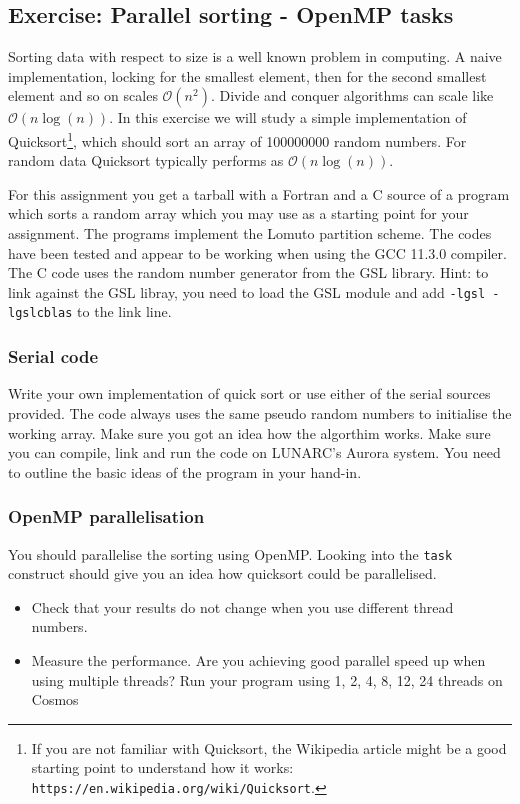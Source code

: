 \subsection{Exercise: Parallel sorting - OpenMP tasks}

Sorting data with respect to size is a well known problem in computing.  A naive implementation, locking for the smallest element, then for the second smallest element and so on scales ${\mathcal O}(n^2)$.  Divide and conquer algorithms can scale like ${\mathcal O}(n \log(n))$.   In this exercise we will study a simple implementation of Quicksort\footnote{If you are not familiar with Quicksort, the Wikipedia article might be a good starting point to understand how it works:  \texttt{https://en.wikipedia.org/wiki/Quicksort}.

 }, which should sort an array of 100000000 random numbers.  For random data Quicksort typically performs as ${\mathcal O}(n \log(n))$.

For this assignment you get a tarball with a Fortran and a C source of a program which sorts a random array which you may use as a starting point for your assignment.   The programs implement the Lomuto partition scheme.  The codes have been tested and appear to be working when using the GCC 11.3.0 compiler.   The C code uses the random number generator from the GSL library.  Hint: to link against the GSL libray, you need to load the GSL module and add \verb+-lgsl -lgslcblas+ to the link line.

\subsubsection{Serial code}
Write your own implementation of quick sort or use either of the serial sources provided. The code always uses the same pseudo random numbers to initialise the working array.  Make sure you got an idea how the algorthim works.  Make sure you can compile, link and run the code on LUNARC's Aurora system.  You need to outline the basic ideas of the program in your hand-in. 

\subsubsection{OpenMP parallelisation}
You should parallelise the sorting using OpenMP. Looking into the \verb+task+ construct should give you an idea how quicksort could be parallelised.
\begin{itemize}
\item Check that your results do not change when you use different thread numbers.
\item Measure the performance.  Are you achieving good parallel speed up when using multiple threads?  Run your program using 1, 2, 4, 8, 12, 24 threads on Cosmos  
\end{itemize}

